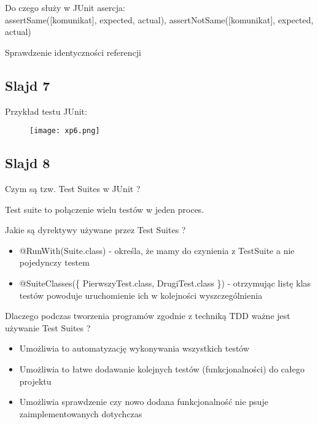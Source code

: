 \documentclass[a4paper,15pt]{article}
\newcommand{\question}[2]{
    \begin{tcolorbox}[colback=mRed!5!white,colframe=mRed,title={Kolokwium 2018 #1}]
        #2
    \end{tcolorbox}
}
\begin{document}
\begin{framed}
Do czego służy w JUnit asercja: \\
assertSame([komunikat], expected, actual), assertNotSame([komunikat], expected, actual) 
\end{framed}
Sprawdzenie identyczności referencji


\subsection{Slajd 7}
Przykład testu JUnit:

\begin{figure}[H]
\centerline{\texttt{[image: xp6.png]}}
\end{figure}


\subsection{Slajd 8}
\begin{framed}
Czym są tzw. Test Suites w JUnit ?
\end{framed}
Test suite to połączenie wielu testów w jeden proces. 

\begin{framed}
Jakie są dyrektywy używane przez Test Suites ?
\end{framed}
\begin{itemize}
\item @RunWith(Suite.class) - określa, że mamy do czynienia z TestSuite a nie pojedynczy testem
\item @SuiteClasses(\{ PierwszyTest.class, DrugiTest.class \})  - otrzymując listę klas testów powoduje uruchomienie ich w kolejności wyszczególnienia
\end{itemize}

\question{}{
Dlaczego podczas tworzenia programów zgodnie z techniką TDD ważne jest używanie Test Suites ? 
}
\begin{itemize}
\item Umożliwia to automatyzację wykonywania wszystkich testów
\item Umożliwia to łatwe dodawanie kolejnych testów (funkcjonalności) do całego projektu
\item Umożliwia sprawdzenie czy nowo dodana funkcjonalność nie psuje zaimplementowanych dotychczas
\end{itemize}
\end{document}
